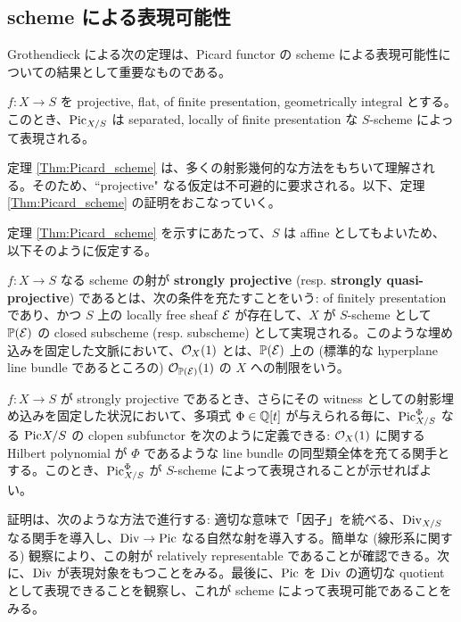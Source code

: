 \subsection{scheme による表現可能性}
Grothendieck による次の定理は、Picard functor の scheme による表現可能性についての結果として重要なものである。

\begin{thm}\label{Thm:Picard_scheme}
  $f \colon X \to S$ を projective, flat, of finite presentation, geometrically integral とする。このとき、$\mathrm{Pic}_{X / S}$ は separated, locally of finite presentation な $S$-scheme によって表現される。
\end{thm}

定理 \ref{Thm:Picard_scheme} は、多くの射影幾何的な方法をもちいて理解される。そのため、``projective" なる仮定は不可避的に要求される。以下、定理 \ref{Thm:Picard_scheme} の証明をおこなっていく。

定理 \ref{Thm:Picard_scheme} を示すにあたって、$S$ は affine としてもよいため、以下そのように仮定する。

\begin{defn}
  $f \colon X \to S$ なる scheme の射が \textbf{strongly projective} (resp. \textbf{strongly quasi-projective}) であるとは、次の条件を充たすことをいう: of finitely presentation であり、かつ $S$ 上の locally free sheaf $\mathcal{E}$ が存在して、$X$ が $S$-scheme として $\mathbb{P}(\mathcal{E})$ の closed subscheme (resp. subscheme) として実現される。このような埋め込みを固定した文脈において、$\mathcal{O}_X(1)$ とは、$\mathbb{P}(\mathcal{E})$ 上の (標準的な hyperplane line bundle であるところの) $\mathcal{O}_{\mathbb{P}(\mathcal{E})}(1)$ の $X$ への制限をいう。
\end{defn}

$f \colon X \to S$ が strongly projective であるとき、さらにその witness としての射影埋め込みを固定した状況において、多項式 $\Phi \in \mathbb{Q}[t]$ が与えられる毎に、$\mathrm{Pic}_{X / S}^\Phi$ なる $\mathrm{Pic}{X / S}$ の clopen subfunctor を次のように定義できる: $\mathcal{O}_X(1)$ に関する Hilbert polynomial が $\Phi$ であるような line bundle の同型類全体を充てる関手とする。このとき、$\mathrm{Pic}_{X / S}^\Phi$ が $S$-scheme によって表現されることが示せればよい。

証明は、次のような方法で進行する: 適切な意味で「因子」を統べる、$\mathrm{Div}_{X / S}$ なる関手を導入し、$\mathrm{Div} \to \mathrm{Pic}$ なる自然な射を導入する。簡単な (線形系に関する) 観察により、この射が relatively representable であることが確認できる。次に、$\mathrm{Div}$ が表現対象をもつことをみる。最後に、$\mathrm{Pic}$ を $\mathrm{Div}$ の適切な quotient として表現できることを観察し、これが scheme によって表現可能であることをみる。

